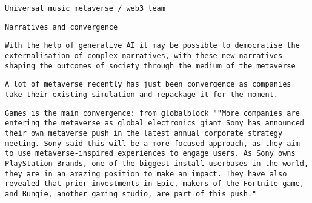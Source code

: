        
       
        \protect\hypertarget{ID_47898693}{}{}

\begin{verbatim}
Universal music metaverse / web3 team
\end{verbatim}
       
     

     
     
      \protect\hypertarget{ID_232114366}{}{}

\begin{verbatim}
Narratives and convergence
\end{verbatim}

       
       
        \protect\hypertarget{ID_411249299}{}{}

\begin{verbatim}
With the help of generative AI it may be possible to democratise the externalisation of complex narratives, with these new narratives shaping the outcomes of society through the medium of the metaverse
\end{verbatim}
       

       
       
        \protect\hypertarget{ID_1809036187}{}{}

\begin{verbatim}
A lot of metaverse recently has just been convergence as companies take their existing simulation and repackage it for the moment.
\end{verbatim}
       

       
       
        \protect\hypertarget{ID_1130122036}{}{}

\begin{verbatim}
Games is the main convergence: from globalblock ""More companies are entering the metaverse as global electronics giant Sony has announced their own metaverse push in the latest annual corporate strategy meeting. Sony said this will be a more focused approach, as they aim to use metaverse-inspired experiences to engage users. As Sony owns PlayStation Brands, one of the biggest install userbases in the world, they are in an amazing position to make an impact. They have also revealed that prior investments in Epic, makers of the Fortnite game, and Bungie, another gaming studio, are part of this push."
\end{verbatim}

         
         
          \protect\hypertarget{ID_574885320}{}{}

